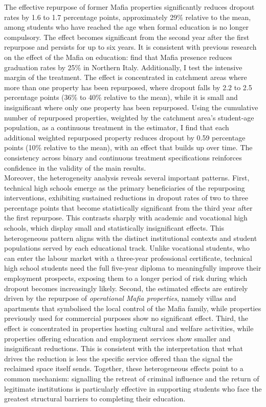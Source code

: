 \documentclass[12pt]{article}
\theoremstyle{plain}
\theoremstyle{plain}
\theoremstyle{plain}
\theoremstyle{definition}
\theoremstyle{plain}
\theoremstyle{definition}
\theoremstyle{plain}
\theoremstyle{remark}
\theoremstyle{definition}
\theoremstyle{definition}
\theoremstyle{plain}
\begin{document}
\medskip
The effective repurpose of former Mafia properties significantly reduces dropout rates by 1.6 to 1.7 percentage points, approximately 29\% relative to the mean, among students who have reached the age when formal education is no longer compulsory. The effect becomes significant from the second year after the first repurpose and persists for up to six years. It is consistent with previous research on the effect of the Mafia on education: \citet{caglayan_hindering_2021} find that Mafia presence reduces graduation rates by 25\% in Northern Italy. Additionally, I test the intensive margin of the treatment. The effect is concentrated in catchment areas where more than one property has been repurposed, where dropout falls by 2.2 to 2.5 percentage points (36\% to 40\% relative to the mean), while it is small and insignificant where only one property has been repurposed. Using the cumulative number of repurposed properties, weighted by the catchment area's student-age population, as a continuous treatment in the \citet{de_chaisemartin_difference--differences_2024} estimator, I find that each additional weighted repurposed property reduces dropout by 0.59 percentage points (10\% relative to the mean), with an effect that builds up over time. The consistency across binary and continuous treatment specifications reinforces confidence in the validity of the main results.  \\
Moreover, the heterogeneity analysis reveals several important patterns. First, technical high schools emerge as the primary beneficiaries of the repurposing interventions, exhibiting sustained reductions in dropout rates of two to three percentage points that become statistically significant from the third year after the first repurpose. This contrasts sharply with academic and vocational high schools, which display small and statistically insignificant effects. This heterogeneous pattern aligns with the distinct institutional contexts and student populations served by each educational track. Unlike vocational students, who can enter the labour market with a three-year professional certificate, technical high school students need the full five-year diploma to meaningfully improve their employment prospects, exposing them to a longer period of risk during which dropout becomes increasingly likely. Second, the estimated effects are entirely driven by the repurpose of \emph{operational Mafia properties}, namely villas and apartments that symbolised the local control of the Mafia family, while properties previously used for commercial purposes show no significant effect. Third, the effect is concentrated in properties hosting cultural and welfare activities, while properties offering education and employment services show smaller and insignificant reductions. This is consistent with the interpretation that what drives the reduction is less the specific service offered than the signal the reclaimed space itself sends. Together, these heterogeneous effects point to a common mechanism: signalling the retreat of criminal influence and the return of legitimate institutions is particularly effective in supporting students who face the greatest structural barriers to completing their education. \par
\end{document}
